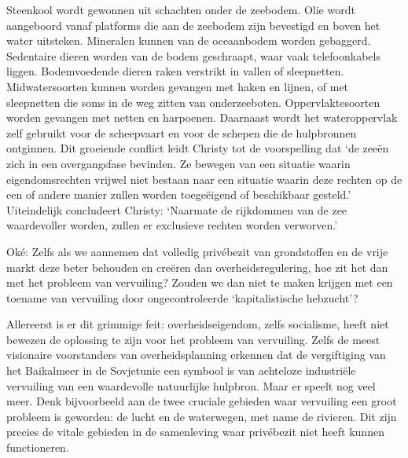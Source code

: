 \documentclass[
  a5paper,
  smalldemyvopaper,10pt,twoside,onecolumn,openright,extrafontsizes,hidelinks]{memoir}
\begin{document}
Steenkool wordt gewonnen uit schachten onder de zeebodem. Olie wordt
aangeboord vanaf platforms die aan de zeebodem zijn bevestigd en boven
het water uitsteken. Mineralen kunnen van de oceaanbodem worden
gebaggerd. Sedentaire dieren worden van de bodem geschraapt, waar vaak
telefoonkabels liggen. Bodemvoedende dieren raken verstrikt in vallen of
sleepnetten. Midwatersoorten kunnen worden gevangen met haken en lijnen,
of met sleepnetten die soms in de weg zitten van onderzeeboten.
Oppervlaktesoorten worden gevangen met netten en harpoenen. Daarnaast
wordt het wateroppervlak zelf gebruikt voor de scheepvaart en voor de
schepen die de hulpbronnen ontginnen. Dit groeiende conflict leidt
Christy tot de voorspelling dat `de zeeën zich in een overgangsfase
bevinden. Ze bewegen van een situatie waarin eigendomsrechten vrijwel
niet bestaan naar een situatie waarin deze rechten op de een of andere
manier zullen worden toegeëigend of beschikbaar gesteld.' Uiteindelijk
concludeert Christy: `Naarmate de rijkdommen van de zee waardevoller
worden, zullen er exclusieve rechten worden verworven.'

Oké: Zelfs als we aannemen dat volledig privébezit van grondstoffen en
de vrije markt deze beter behouden en creëren dan overheidsregulering,
hoe zit het dan met het probleem van vervuiling? Zouden we dan niet te
maken krijgen met een toename van vervuiling door ongecontroleerde
`kapitalistische hebzucht'?

Allereerst is er dit grimmige feit: overheidseigendom, zelfs socialisme,
heeft niet bewezen de oplossing te zijn voor het probleem van
vervuiling. Zelfs de meest visionaire voorstanders van overheidsplanning
erkennen dat de vergiftiging van het Baikalmeer in de Sovjetunie een
symbool is van achteloze industriële vervuiling van een waardevolle
natuurlijke hulpbron. Maar er speelt nog veel meer. Denk bijvoorbeeld
aan de twee cruciale gebieden waar vervuiling een groot probleem is
geworden: de lucht en de waterwegen, met name de rivieren. Dit zijn
precies de vitale gebieden in de samenleving waar privébezit niet heeft
kunnen functioneren.
\end{document}
